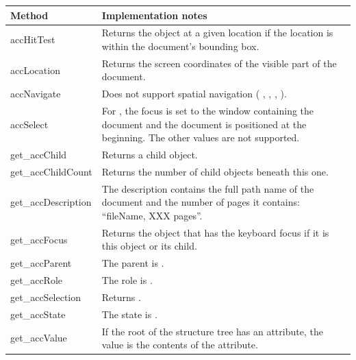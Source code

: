 \documentclass[letterpaper,12pt,english,openany,oneside]{sphinxmanual}
\begin{document}
\begin{savenotes}\sphinxattablestart
\centering
{}\label{\detokenize{MSAA_PDF:section-17}}\nobreak
\begin{tabulary}{\linewidth}[t]{|T|T|}
\hline
\sphinxstyletheadfamily 
Method
&\sphinxstyletheadfamily 
Implementation notes
\\
\hline
accHitTest
&
Returns the object at a given location if the location is within the document’s bounding box.
\\
\hline
accLocation
&
Returns the screen coordinates of the visible part of the document.
\\
\hline
accNavigate
&
Does not support spatial navigation ( ,  ,  ,  ).
\\
\hline
accSelect
&
For  , the focus is set to the window containing the document and the document is positioned at the beginning. The other  values are not supported.
\\
\hline
get\_accChild
&
Returns a child object.
\\
\hline
get\_accChildCount
&
Returns the number of child objects beneath this one.
\\
\hline
get\_accDescription
&
The description contains the full path name of the document and the number of pages it contains: “fileName, XXX pages”.
\\
\hline
get\_accFocus
&
Returns the object that has the keyboard focus if it is this object or its child.
\\
\hline
get\_accParent
&
The parent is  .
\\
\hline
get\_accRole
&
The role is  .
\\
\hline
get\_accSelection
&
Returns  .
\\
\hline
get\_accState
&
The state is  .
\\
\hline
get\_accValue
&
If the root of the structure tree has an  attribute, the value is the contents of the  attribute.
\\
\hline
\end{tabulary}
\par
\sphinxattableend\end{savenotes}
\end{document}
